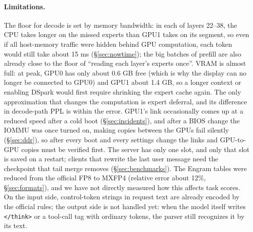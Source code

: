 \documentclass[11pt,a4paper]{article}
\newcommand{\code}[1]{\texttt{#1}}
\begin{document}
\paragraph{Limitations.} The floor for decode is set by memory bandwidth: in each of layers 22--38, the CPU takes longer on the missed experts than GPU1 takes on its segment, so even if all host-memory traffic were hidden behind GPU computation, each token would still take about 15 ms (\S\ref{sec:nowtime}); the big batches of prefill are also already close to the floor of ``reading each layer's experts once''. VRAM is almost full: at peak, GPU0 has only about 0.6 GB free (which is why the display can no longer be connected to GPU0) and GPU1 about 1.4 GB, so a longer context or enabling DSpark would first require shrinking the expert cache again. The only approximation that changes the computation is expert deferral, and its difference in decode-path PPL is within the error. GPU1's link occasionally comes up at a reduced speed after a cold boot (\S\ref{sec:incidents}), and after a BIOS change the IOMMU was once turned on, making copies between the GPUs fail silently (\S\ref{sec:ddr}), so after every boot and every settings change the links and GPU-to-GPU copies must be verified first. The server has only one slot, and only that slot is saved on a restart; clients that rewrite the last user message need the checkpoint that tail merge removes (\S\ref{sec:benchmarks}). The Engram tables were reduced from the official FP8 to MXFP4 (relative error about 12\%, \S\ref{sec:formats}), and we have not directly measured how this affects task scores. On the input side, control-token strings in request text are already encoded by the official rules; the output side is not handled yet: when the model itself writes \code{</think>} or a tool-call tag with ordinary tokens, the parser still recognizes it by its text.
\end{document}
